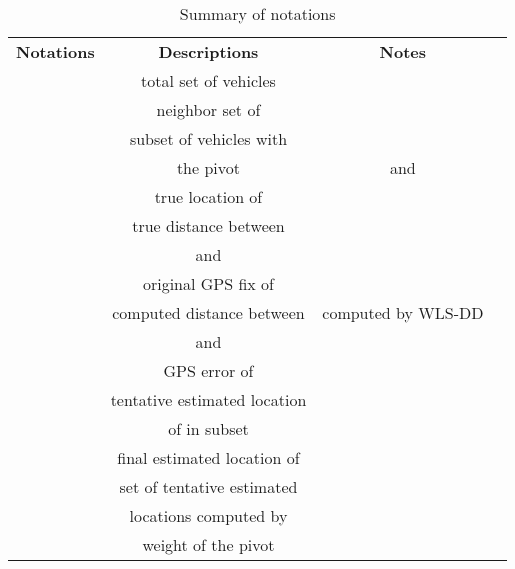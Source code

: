 \documentclass[letterpaper, 10 pt, conference]{ieeeconf}
\begin{document}
\begin {table}\footnotesize
\renewcommand{\arraystretch}{1.4}
\centering \caption{Summary of notations} \label{table:notations}
\begin{tabular}{|l|l|l|l}
\cline{1-3}
\multicolumn{1}{|c|}{\textbf{Notations}} & \multicolumn{1}{c|}{\textbf{Descriptions}} & \multicolumn{1}{c|}{\textbf{Notes}} &  \\
\cline{1-3}
\multicolumn{1}{|c|}{} & \multicolumn{1}{c|}{total set of vehicles} & \multicolumn{1}{c|}{} &  \\
\cline{1-3}
\multicolumn{1}{|c|}{} & \multicolumn{1}{c|}{neighbor set of } & \multicolumn{1}{c|}{} &  \\
\cline{1-3}
\multicolumn{1}{|c|}{} & \multicolumn{1}{c|}{subset of vehicles with } & \multicolumn{1}{c|}{} &  \\
\multicolumn{1}{|c|}{} & \multicolumn{1}{c|}{the pivot } & \multicolumn{1}{c|}{and } &  \\
\cline{1-3}
\multicolumn{1}{|c|}{} & \multicolumn{1}{c|}{true location of } & \multicolumn{1}{c|}{} &  \\
\cline{1-3}
\multicolumn{1}{|c|}{} & \multicolumn{1}{c|}{true distance between } & \multicolumn{1}{c|}{
} &  \\
\multicolumn{1}{|c|}{} & \multicolumn{1}{c|}{ and } & \multicolumn{1}{c|}{} &  \\
\cline{1-3}
\multicolumn{1}{|c|}{} & \multicolumn{1}{c|}{original GPS fix of } & \multicolumn{1}{c|}{} &  \\
\cline{1-3}
\multicolumn{1}{|c|}{} & \multicolumn{1}{c|}{computed distance between } & \multicolumn{1}{c|}{computed by WLS-DD} &  \\
\multicolumn{1}{|c|}{} & \multicolumn{1}{c|}{  and } & \multicolumn{1}{c|}{} &  \\
\cline{1-3}
\multicolumn{1}{|c|}{} & \multicolumn{1}{c|}{GPS error of } & \multicolumn{1}{c|}{} &  \\
\cline{1-3}
\multicolumn{1}{|c|}{} & \multicolumn{1}{c|}{tentative estimated location } & \multicolumn{1}{c|}{} &  \\
\multicolumn{1}{|c|}{} & \multicolumn{1}{c|}{of  in subset } & \multicolumn{1}{c|}{} &  \\
\cline{1-3}
\multicolumn{1}{|c|}{} & \multicolumn{1}{c|}{final estimated location of } & \multicolumn{1}{c|}{} &  \\
\cline{1-3}
\multicolumn{1}{|c|}{} & \multicolumn{1}{c|}{set of tentative estimated } & \multicolumn{1}{c|}{} &  \\
\multicolumn{1}{|c|}{} & \multicolumn{1}{c|}{locations computed by } & \multicolumn{1}{c|}{} &  \\
\cline{1-3}
\multicolumn{1}{|c|}{} & \multicolumn{1}{c|}{weight of the pivot } & \multicolumn{1}{c|}{} &  \\
\cline{1-3}
\end{tabular}
\end{table}
\normalsize
\end{document}
